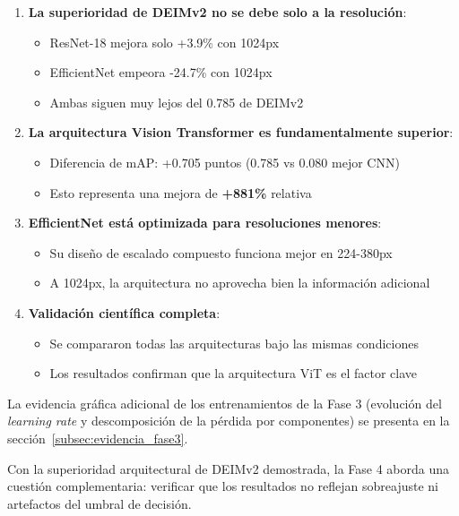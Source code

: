 \begin{enumerate}
    \item \textbf{La superioridad de DEIMv2 no se debe solo a la resolución}:
    \begin{itemize}
        \item ResNet-18 mejora solo +3.9\% con 1024px
        \item EfficientNet empeora -24.7\% con 1024px
        \item Ambas siguen muy lejos del 0.785 de DEIMv2
    \end{itemize}
    
    \item \textbf{La arquitectura Vision Transformer es fundamentalmente superior}:
    \begin{itemize}
        \item Diferencia de mAP: +0.705 puntos (0.785 vs 0.080 mejor CNN)
        \item Esto representa una mejora de \textbf{+881\%} relativa
    \end{itemize}
    
    \item \textbf{EfficientNet está optimizada para resoluciones menores}:
    \begin{itemize}
        \item Su diseño de escalado compuesto funciona mejor en 224-380px
        \item A 1024px, la arquitectura no aprovecha bien la información adicional
    \end{itemize}
    
    \item \textbf{Validación científica completa}:
    \begin{itemize}
        \item Se compararon todas las arquitecturas bajo las mismas condiciones
        \item Los resultados confirman que la arquitectura ViT es el factor clave
    \end{itemize}
\end{enumerate}

La evidencia gráfica adicional de los entrenamientos de la Fase 3 (evolución del \textit{learning rate} y descomposición de la pérdida por componentes) se presenta en la sección~\ref{subsec:evidencia_fase3}.

Con la superioridad arquitectural de DEIMv2 demostrada, la Fase 4 aborda una cuestión complementaria: verificar que los resultados no reflejan sobreajuste ni artefactos del umbral de decisión.

